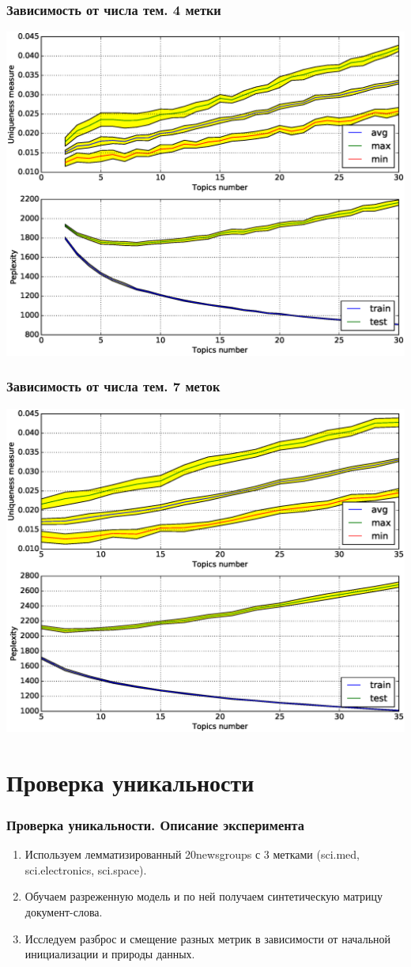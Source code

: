 \documentclass[utf8]{beamer}
\begin{document}
	
	\begin{frame}	
	\frametitle{Зависимость от числа тем. 4 метки}
	\includegraphics[width=0.75\linewidth]{presentation_pictures/topics_dependency_origin_4_ums.eps} 
	\end{frame}

	
	\begin{frame}	
	\frametitle{Зависимость от числа тем. 7 меток}
	\includegraphics[width=0.75\linewidth]{presentation_pictures/topics_dependency_origin_big_ums.eps} 
	\end{frame}
	
	\section{Проверка уникальности}
	\begin{frame}	
	\frametitle{Проверка уникальности. Описание эксперимента}
	\begin{enumerate}
\item Используем лемматизированный 20newsgroups с 3 метками (sci.med, sci.electronics, sci.space).
\item Обучаем разреженную модель и по ней получаем синтетическую матрицу документ-слова. 
\item Исследуем разброс и смещение разных метрик в зависимости от начальной инициализации и природы данных.
\end{enumerate}
	\end{frame}
	
\end{document}
